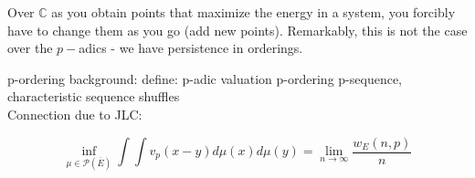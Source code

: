 Over $\mathbb{C}$ as you obtain points that maximize the energy in a system, you forcibly have to change them as you go (add new points). Remarkably, this is not the case over the $p-$adics - we have persistence in orderings.

p-ordering background:
define: 
p-adic valuation
p-ordering
p-sequence, characteristic sequence
shuffles\\

Connection due to JLC:
\begin{definition}
\[\inf_{\mu \in \mathcal{P}(\overline{E})} \int \int v_p(x-y)d \mu (x)d \mu (y) = \lim_{n\to\infty} \frac{w_E(n,p)}{n}\]
\end{definition}